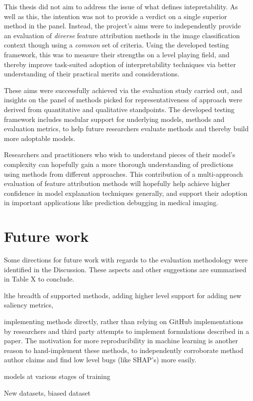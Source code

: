 \documentclass[main]{subfiles}
\begin{document}
This thesis did not aim to address the issue of what defines intepretability. As well as this, the intention was not to provide a verdict on a single superior method in the panel. Instead, the project's aims were to independently provide an evaluation of \textit{diverse} feature attribution methods in the image classification context though using a \textit{common} set of criteria. Using  the developed testing framework, this was to measure their strengths on a level playing field, and thereby improve task-suited adoption of interpretability techniques via better understanding of their practical merits and considerations.

These aims were successfully achieved via the evaluation study carried out, and insights on the panel of methods picked for representativeness of approach were derived from quantitative and qualitative standpoints. The developed testing framework includes modular support for underlying models, methods and evaluation metrics, to help future researchers evaluate methods and thereby build more adoptable models.

Researchers and practitioners who wish to understand pieces of their model's complexity can hopefully gain a more thorough understanding of predictions using methods from different approaches. This contribution of a multi-approach evaluation of feature attribution methods will hopefully help achieve higher confidence in model explanation techniques generally, and support their adoption in important applications like prediction debugging in medical imaging.

\section{Future work}

Some directions for future work with regards to the evaluation methodology were identified in the Discussion. These aspects and other suggestions are summarised in Table X to conclude.


lthe breadth of supported methods, adding higher level support for adding new saliency metrics, 

implementing methods directly, rather than relying on GitHub implementations by researchers and third party attempts to implement formulations described in a paper. The motivation for more reproducibility in machine learning is another reason to hand-implement these methods, to independently corroborate method author claims and find low level bugs (like SHAP's) more easily.

models at various stages of training

New datasets, biased dataset
\end{document}
